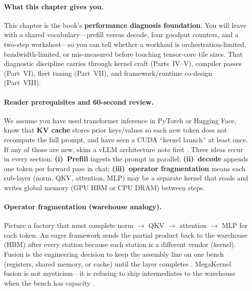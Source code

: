 \paragraph{What this chapter gives you.}
This chapter is the book's \textbf{performance diagnosis foundation}.
You will leave with a shared vocabulary---prefill versus decode, four goodput counters, and a two-step worksheet---so you can tell whether a workload is orchestration-limited, bandwidth-limited, or mis-measured before touching tensor-core tile sizes.
That diagnostic discipline carries through kernel craft (Parts~IV--V), compiler passes (Part~VI), fleet tuning (Part~VII), and framework/runtime co-design (Part~VIII).

\paragraph{Reader prerequisites and 60-second review.}
We assume you have used transformer inference in PyTorch or Hugging Face, know that \textbf{KV cache} stores prior keys/values so each new token does not recompute the full prompt, and have seen a CUDA ``kernel launch'' at least once.
If any of those are new, skim a vLLM architecture note first \citep{kwon2023vllm}.
Three ideas recur in every section:
\textbf{(i)~Prefill} ingests the prompt in parallel; \textbf{(ii)~decode} appends one token per forward pass in chat; \textbf{(iii)~operator fragmentation} means each sub-layer (norm, QKV, attention, MLP) may be a separate kernel that reads and writes global memory (GPU HBM or CPU DRAM) between steps.


\paragraph{Operator fragmentation (warehouse analogy).}
Picture a factory that must complete norm $\rightarrow$ QKV $\rightarrow$ attention $\rightarrow$ MLP for each token.
An eager framework sends the partial product back to the warehouse (HBM) after every station because each station is a different vendor (kernel).
Fusion is the engineering decision to keep the assembly line on one bench (registers, shared memory, or cache) until the layer completes \citep{yirage2026,chen2020compilerbasedhardw}.
MegaKernel fusion is not mysticism---it is refusing to ship intermediates to the warehouse when the bench has capacity \citep{dao2022flashattention}.

